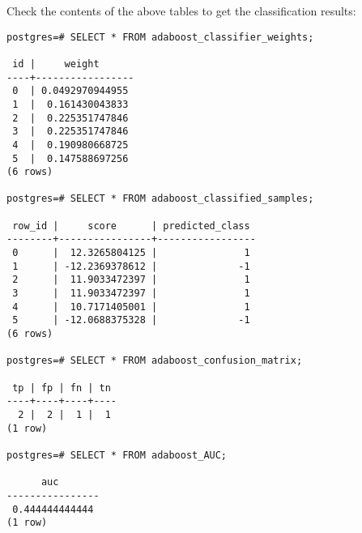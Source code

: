 {\raggedleft Check the contents of the above tables to get the classification results:}

\begin{verbatim}
postgres=# SELECT * FROM adaboost_classifier_weights;

 id |     weight      
----+-----------------
 0  | 0.0492970944955
 1  |  0.161430043833
 2  |  0.225351747846
 3  |  0.225351747846
 4  |  0.190980668725
 5  |  0.147588697256
(6 rows)

postgres=# SELECT * FROM adaboost_classified_samples;

 row_id |     score      | predicted_class 
--------+----------------+-----------------
 0      |  12.3265804125 |               1
 1      | -12.2369378612 |              -1
 2      |  11.9033472397 |               1
 3      |  11.9033472397 |               1
 4      |  10.7171405001 |               1
 5      | -12.0688375328 |              -1
(6 rows)

postgres=# SELECT * FROM adaboost_confusion_matrix;

 tp | fp | fn | tn 
----+----+----+----
  2 |  2 |  1 |  1
(1 row)

postgres=# SELECT * FROM adaboost_AUC;

      auc       
----------------
 0.444444444444
(1 row)

\end{verbatim}




